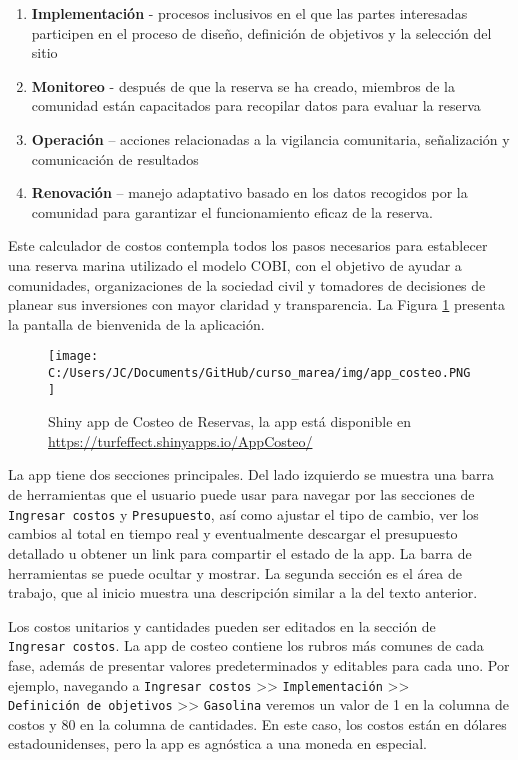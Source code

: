 \documentclass[]{krantz}
\providecommand{\tightlist}{%
  \setlength{\itemsep}{0pt}\setlength{\parskip}{0pt}}
\begin{document}
\begin{enumerate}
\def\labelenumi{\arabic{enumi}.}
\tightlist
\item
  \textbf{Implementación} - procesos inclusivos en el que las partes
  interesadas participen en el proceso de diseño, definición de
  objetivos y la selección del sitio
\item
  \textbf{Monitoreo} - después de que la reserva se ha creado, miembros
  de la comunidad están capacitados para recopilar datos para evaluar la
  reserva
\item
  \textbf{Operación} -- acciones relacionadas a la vigilancia
  comunitaria, señalización y comunicación de resultados
\item
  \textbf{Renovación} -- manejo adaptativo basado en los datos recogidos
  por la comunidad para garantizar el funcionamiento eficaz de la
  reserva.
\end{enumerate}

Este calculador de costos contempla todos los pasos necesarios para
establecer una reserva marina utilizado el modelo COBI, con el objetivo
de ayudar a comunidades, organizaciones de la sociedad civil y tomadores
de decisiones de planear sus inversiones con mayor claridad y
transparencia. La Figura \ref{fig:shiny-costeo} presenta la pantalla de
bienvenida de la aplicación.

\begin{figure}
\centering
\texttt{[image: C:/Users/JC/Documents/GitHub/curso\_marea/img/app\_costeo.PNG]}
\caption{\label{fig:shiny-costeo}Shiny app de Costeo de Reservas, la app
está disponible en \url{https://turfeffect.shinyapps.io/AppCosteo/}}
\end{figure}

La app tiene dos secciones principales. Del lado izquierdo se muestra
una barra de herramientas que el usuario puede usar para navegar por las
secciones de \texttt{Ingresar\ costos} y \texttt{Presupuesto}, así como
ajustar el tipo de cambio, ver los cambios al total en tiempo real y
eventualmente descargar el presupuesto detallado u obtener un link para
compartir el estado de la app. La barra de herramientas se puede ocultar
y mostrar. La segunda sección es el área de trabajo, que al inicio
muestra una descripción similar a la del texto anterior.

Los costos unitarios y cantidades pueden ser editados en la sección de
\texttt{Ingresar\ costos}. La app de costeo contiene los rubros más
comunes de cada fase, además de presentar valores predeterminados y
editables para cada uno. Por ejemplo, navegando a
\texttt{Ingresar\ costos} \textgreater{}\textgreater{}
\texttt{Implementación} \textgreater{}\textgreater{}
\texttt{Definición\ de\ objetivos} \textgreater{}\textgreater{}
\texttt{Gasolina} veremos un valor de 1 en la columna de costos y 80 en
la columna de cantidades. En este caso, los costos están en dólares
estadounidenses, pero la app es agnóstica a una moneda en especial.
\end{document}
